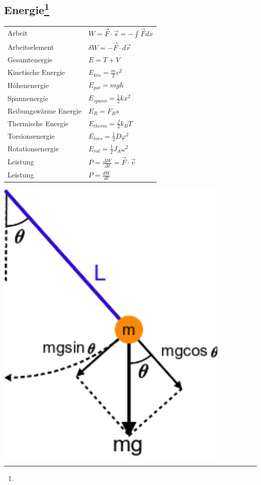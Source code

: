 \documentclass[12pt,a4paper]{article}
\renewcommand{\d}[2]{\frac{d #1}{d #2}}
\renewcommand{\=}[1]{\stackrel{#1}{=}}
\theoremstyle{definition}
\theoremstyle{remark}
\begin{document}
\subsection[Energie]{Energie\let\thefootnote\relax\footnote{}}

\begin{center}
\begin{minipage}[t]{.5\linewidth}
\vspace{0pt}
\begin{tabular}{ll}
Arbeit & $W = \vec{F} \cdot \vec{s} = -\int \vec{F} dx$\\
Arbeitselement & $\delta W = -\vec{F} \cdot d\vec{r}$\\
Gesamtenergie & $E = T + V$\\
Kinetische Energie & $E_{kin} = \frac{m}{2} v ^2$\\
Höhenenergie & $E_{pot} = mgh$\\
Spannenergie & $E_{spann} = \frac{1}{2}kx^2$\\
Reibungswärme Energie & $E_{R} = F_R s$\\
Thermische Energie & $E_{therm} = \frac{f}{2} k_B T$\\
Torsionsenergie & $E_{tors} = \frac{1}{2} D \varphi^2$\\
Rotationsenergie & $E_{rot} = \frac{1}{2} J_A \omega^2$\\
Leistung & $P = \frac{\Delta W}{\Delta t} = \vec{F} \cdot \vec{v}$\\
Leistung & $P = \d{W}{t}$\\
\end{tabular}
\end{minipage}%
\begin{minipage}[t]{.5\linewidth}
\vspace{0pt}
\centering
\includegraphics[width=0.7\linewidth]{pic/p22.pdf}
\end{minipage}
\end{center}
\end{document}
